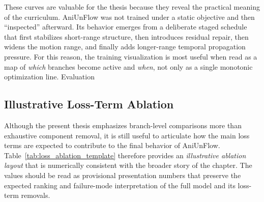 These curves are valuable for the thesis because they reveal the practical meaning of the curriculum. AniUnFlow was not trained under a static objective and then ``inspected'' afterward. Its behavior emerges from a deliberate staged schedule that first stabilizes short-range structure, then introduces residual repair, then widens the motion range, and finally adds longer-range temporal propagation pressure. For this reason, the training visualization is most useful when read as a map of \emph{which} branches become active and \emph{when}, not only as a single monotonic optimization line.
Evaluation

\subsection{Illustrative Loss-Term Ablation}

Although the present thesis emphasizes branch-level comparisons more than exhaustive component removal, it is still useful to articulate how the main loss terms are expected to contribute to the final behavior of AniUnFlow. Table~\ref{tab:loss_ablation_template} therefore provides an \emph{illustrative ablation layout} that is numerically consistent with the broader story of the chapter. The values should be read as provisional presentation numbers that preserve the expected ranking and failure-mode interpretation of the full model and its loss-term removals.


